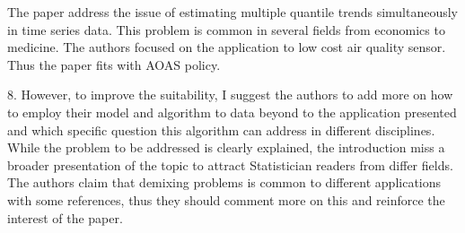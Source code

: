 \documentclass{article}
\begin{document}

The paper address the issue of estimating multiple quantile trends simultaneously in time series data. This problem is common in several fields from economics to medicine. The authors focused on the application to low cost air quality sensor. Thus the paper fits with AOAS policy. 

8. However, to improve the suitability, I suggest the authors to add more on how to employ their model and algorithm to data beyond to the application presented and which specific question this algorithm can address in different disciplines. While the problem to be addressed is clearly explained, the introduction miss a broader presentation of the topic to attract Statistician readers from differ fields. The authors claim that demixing problems is common to different applications with some references, thus they should comment more on this and reinforce the interest of the paper. 
\end{document}
